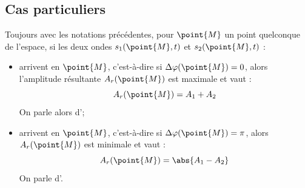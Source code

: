 \subsection{Cas particuliers}

\begin{propriete}
Toujours avec les notations précédentes, pour $\point{M}$ un point quelconque de l'espace, si les deux ondes $s_1(\point{M}, t)$ et $s_2(\point{M}, t)$ : 

\begin{itemize}
\item arrivent  en $\point{M}$, c'est-à-dire si $\Delta\varphi(\point{M}) = 0$, alors l'amplitude résultante $A_r(\point{M})$ est maximale et vaut :
\[A_r(\point{M}) = A_1 + A_2\]
On parle alors d';

\item arrivent  en $\point{M}$, c'est-à-dire si $\Delta\varphi(\point{M}) = \pi$, alors $A_r(\point{M})$ est minimale et vaut :
\[A_r(\point{M}) = \abs{A_1 - A_2}\]
On parle d'.
\end{itemize}
\end{propriete}